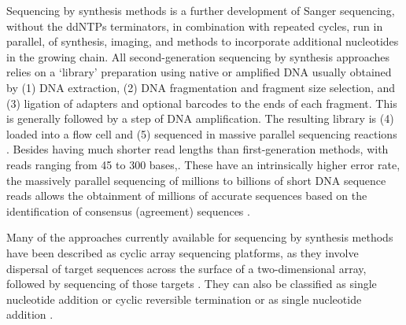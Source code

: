 Sequencing by synthesis methods is a further development of Sanger sequencing, without the ddNTPs terminators, in combination with repeated cycles, run in parallel, of synthesis, imaging, and methods to incorporate additional nucleotides in the growing chain. 
All second-generation sequencing by synthesis approaches relies on a ‘library’ preparation using native or amplified DNA usually obtained by (1) DNA extraction, (2) DNA fragmentation and fragment size selection, and (3) ligation of adapters and optional barcodes to the ends of each fragment. 
This is generally followed by a step of DNA amplification. The resulting library is (4) loaded into a flow cell and (5) sequenced in massive parallel sequencing reactions \citep{giani_long_2020}.
Besides having much shorter read lengths than first-generation methods, with reads ranging from 45 to 300 bases,. These have an intrinsically higher error rate, the massively parallel sequencing of millions to billions of short DNA sequence reads allows the obtainment of millions of accurate sequences based on the identification of consensus (agreement) sequences \citep{slatko_overview_2018, goodwin_coming_2016, hagemann_overview_2015}. 

Many of the approaches currently available for sequencing by synthesis methods have been described as cyclic array sequencing platforms, as they involve dispersal of target sequences across the surface of a two-dimensional array, followed by sequencing of those targets \citep{hagemann_overview_2015}. 
They can also be classified as single nucleotide addition or cyclic reversible termination or as single nucleotide addition \citep{goodwin_coming_2016}. 

